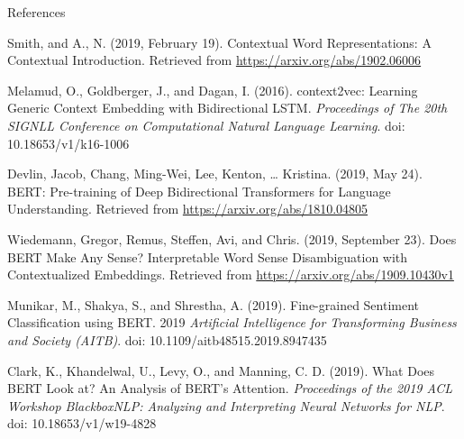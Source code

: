 

\begin{frame}{References}


\vspace{10pt}
\begin{enumerateSpaced}{2pt}
    \scriptsize\linespread{0.1} 
    
    \item Smith, and A., N. (2019, February 19). Contextual Word Representations: A Contextual Introduction. Retrieved from \url{https://arxiv.org/abs/1902.06006}

    \item Melamud, O., Goldberger, J., and Dagan, I. (2016). context2vec: Learning Generic Context Embedding with Bidirectional LSTM. \emph{Proceedings of The 20th SIGNLL Conference on Computational Natural Language Learning}. doi: 10.18653/v1/k16-1006
    
    \item Devlin, Jacob, Chang, Ming-Wei, Lee, Kenton, … Kristina. (2019, May 24). BERT: Pre-training of Deep Bidirectional Transformers for Language Understanding. Retrieved from \url{https://arxiv.org/abs/1810.04805}
    
    \item Wiedemann, Gregor, Remus, Steffen, Avi, and Chris. (2019, September 23). Does BERT Make Any Sense? Interpretable Word Sense Disambiguation with Contextualized Embeddings. Retrieved from \url{https://arxiv.org/abs/1909.10430v1}
    
    \item Munikar, M., Shakya, S., and Shrestha, A. (2019). Fine-grained Sentiment Classification using BERT. 2019 \emph{Artificial Intelligence for Transforming Business and Society (AITB)}. doi: 10.1109/aitb48515.2019.8947435
    
    \item Clark, K., Khandelwal, U., Levy, O., and Manning, C. D. (2019). What Does BERT Look at? An Analysis of BERT’s Attention. \emph{Proceedings of the 2019 ACL Workshop BlackboxNLP: Analyzing and Interpreting Neural Networks for NLP}. doi: 10.18653/v1/w19-4828
    
    
    
    
\end{enumerateSpaced}
    
\end{frame}





